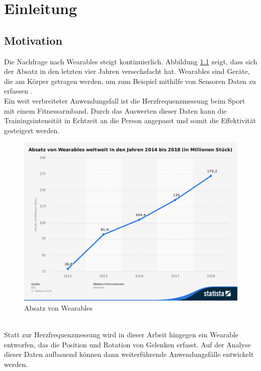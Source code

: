\chapter{Einleitung}
\label{ch:introduction}

\section{Motivation}
Die Nachfrage nach Wearables steigt kontinuierlich.
Abbildung \ref{fig:stat_wearables} zeigt, dass sich der Absatz in den letzten vier Jahren versechsfacht hat.
Wearables sind Geräte, die am Körper getragen werden, um zum Beispiel mithilfe von Sensoren Daten zu erfassen \cite{definition_wearables}.\\
Ein weit verbreiteter Anwendungsfall ist die Herzfrequenzmessung beim Sport mit einem Fitnessarmband.
Durch das Auswerten dieser Daten kann die Trainingsintensität in Echtzeit an die Person angepasst und somit die Effektivität gesteigert werden.
\begin{figure}[hbtp]
	\centering
	\includegraphics[width=0.75\linewidth]{res/01_statistic_id515723_absatz-von-wearables-weltweit-bis-2018.png}
	\caption{Absatz von Wearables \cite{statistik_wearables}}
	\label{fig:stat_wearables}
\end{figure}\\
Statt zur Herzfrequenzmessung wird in dieser Arbeit hingegen ein Wearable entworfen, das die Position und Rotation von Gelenken erfasst.
Auf der Analyse dieser Daten aufbauend können dann weiterführende Anwendungsfälle entwickelt werden.
